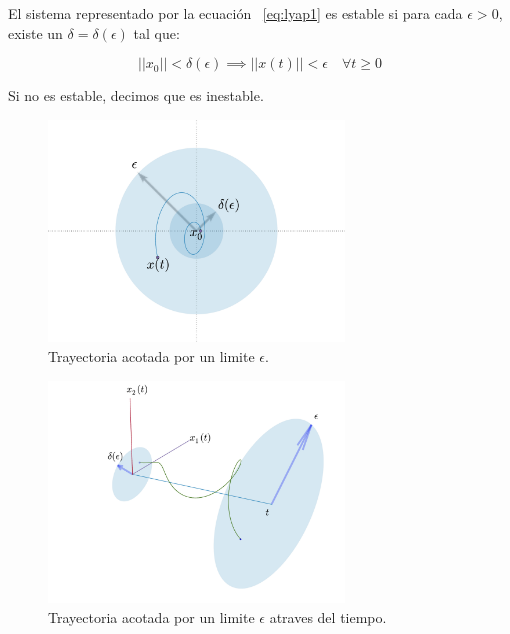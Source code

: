         \begin{definicion}
            El sistema representado por la ecuación ~\ref{eq:lyap1} es estable si para cada $\epsilon > 0$, existe un $\delta = \delta(\epsilon)$ tal que:

            \begin{equation*}
                ||x_0|| < \delta(\epsilon) \implies  ||x(t)||  < \epsilon \quad \forall t \ge 0
            \end{equation*}

            Si no es estable, decimos que es inestable.

            \begin{figure}
                \centering
                \includegraphics[width=0.7\textwidth]{./imagenes/trayectoriaacotada.pdf}
                \caption{\label{fig:trayectoriaestable}Trayectoria acotada por un limite $\epsilon$.}
            \end{figure}

            \begin{figure}
                \centering
                \includegraphics[width=0.7\textwidth]{./imagenes/trayectoriaacotada3d.pdf}
                \caption{\label{fig:trayectoriaestable3d}Trayectoria acotada por un limite $\epsilon$ atraves del tiempo.}
            \end{figure}

        \end{definicion}

